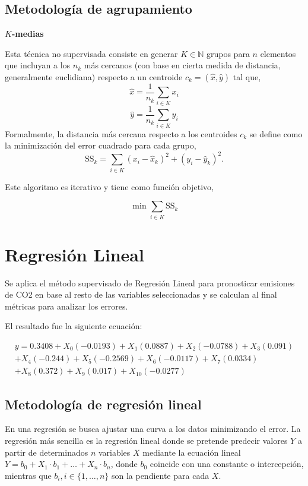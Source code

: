 \documentclass{article}
\begin{document}
\newpage

\subsection{Metodología de agrupamiento}

    \textbf{$K$-medias}\n

    Esta técnica no supervisada consiste en generar $K \in \mathbb{N}$ grupos para $n$ elementos que incluyan a los $n_k$ más cercanos (con base en cierta medida de distancia, generalmente euclidiana) respecto a un centroide $c_k = (\hat{x}, \hat{y})$ tal que\n,
    $$\hat{x} = \frac{1}{n_k} \sum_{i \in K} x_i$$ \n
    $$\hat{y} = \frac{1}{n_k} \sum_{i \in K} y_i$$ \n
    \n
    Formalmente, la distancia más cercana respecto a los centroides $c_k$ se define como la minimización del error cuadrado para cada grupo\n,
    $$\text{SS}_k = \sum_{i \in K} (x_i - \hat{x}_k)^2 + (y_i - \hat{y}_k)^2.$$\n

    Este algoritmo es iterativo y tiene como función objetivo\n,

    $$\min \sum_{i \in K} \text{SS}_k$$


\section{Regresión Lineal}

Se aplica el método supervisado de Regresión Lineal para pronosticar emisiones de CO2 en base al resto de las variables seleccionadas y se calculan al final métricas para analizar los errores.

El resultado fue la siguiente ecuación:

\begin{multline*}
y = 0.3408 + X_0 (-0.0193) + X_1 (0.0887) + X_2 (-0.0788) + X_3 (0.091) \\
+ X_4 (-0.244) + X_5 (-0.2569) + X_6 (-0.0117) + X_7 (0.0334) \\
+ X_8 (0.372) + X_9 (0.017) + X_10 (-0.0277)
\end{multline*}


\subsection{Metodología de regresión lineal}

En una regresión se busca ajustar una curva a los datos minimizando el error. La regresión más sencilla es la regresión lineal donde se pretende predecir valores $Y$ a partir de determinados $n$ variables $X$ mediante la ecuación lineal $Y = b_0 + X_1 \cdot b_1 + \ldots + X_n \cdot b_n$, donde $b_0$ coincide con una constante o intercepción, mientras que $b_i, i \in \{1, \ldots, n\}$ son la pendiente para cada $X$.
\end{document}
